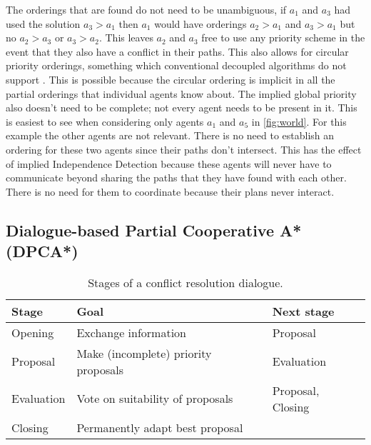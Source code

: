The orderings that are found do not need to be unambiguous, if $a_1$ and $a_3$
had used the solution $a_3 > a_1$ then $a_1$ would have orderings $a_2 > a_1$
and $a_3 > a_1$ but no $a_2 > a_3$ or $a_3 > a_2$. This leaves $a_2$ and $a_3$
free to use any priority scheme in the event that they also have a conflict in
their paths. This also allows for circular priority orderings, something which
conventional decoupled algorithms do not support \cite{bennewitz2002}. This is 
possible because the
circular ordering is implicit in all the partial orderings that individual
agents know about. The implied global priority also doesn't need to be
complete; not every agent needs to be present in it. This is easiest to see
when considering only agents $a_1$ and $a_5$ in \autoref{fig:world}. For this
example the other agents are not relevant. There is no need to establish an
ordering for these two agents since their paths don't intersect. This has the 
effect
of implied Independence Detection \cite{standley2010} because these agents will
never have to communicate beyond sharing the paths that they have found with
each other. There is no need for them to coordinate because their plans never
interact.


\subsection{Dialogue-based Partial Cooperative A* (DPCA*)}

\begin{table}
    \centering
    \caption{Stages of a conflict resolution dialogue.}
    \label{tbl:stages}
    \begin{tabular}{l|l|l}
        Stage & Goal & Next stage \\ \hline
        Opening & Exchange information & Proposal \\
        Proposal & Make (incomplete) priority proposals & Evaluation \\
        Evaluation & Vote on suitability of proposals & Proposal, Closing \\
        Closing & Permanently adapt best proposal & \\
    \end{tabular}
\end{table}


